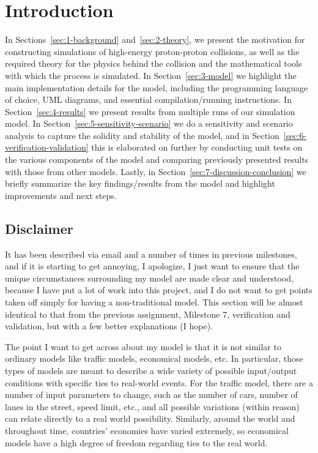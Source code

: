 

\section*{Introduction}\label{sec:0-intro}

In Sections~\ref{sec:1-background} and~\ref{sec:2-theory}, we present the motivation for constructing simulations of high-energy proton-proton collisions, as well as the required theory for the physics behind the collision and the mathematical tools with which the process is simulated. In Section~\ref{sec:3-model} we highlight the main implementation details for the model, including the programming language of choice, UML diagrams, and essential compilation/running instructions. In Section~\ref{sec:4-results} we present results from multiple runs of our simulation model. In Section~\ref{sec:5-sensitivity-scenario} we do a sensitivity and scenario analysis to capture the solidity and stability of the model, and in Section~\ref{sec:6-verification-validation} this is elaborated on further by conducting unit tests on the various components of the model and comparing previously presented results with those from other models. Lastly, in Section~\ref{sec:7-discussion-conclusion} we briefly summarize the key findings/results from the model and highlight improvements and next steps.


\subsection*{Disclaimer}\label{sec:0-disclaimer}

It has been described via email and a number of times in previous milestones, and if it is starting to get annoying, I apologize, I just want to ensure that the unique circumstances surrounding my model are made clear and understood, because I have put a lot of work into this project, and I do not want to get points taken off simply for having a non-traditional model. This section will be almost identical to that from the previous assignment, Milestone 7, verification and validation, but with a few better explanations (I hope).

The point I want to get across about my model is that it is not similar to ordinary models like traffic models, economical models, etc. In particular, those types of models are meant to describe a wide variety of possible input/output conditions with specific ties to real-world events. For the traffic model, there are a number of input parameters to change, such as the number of cars, number of lanes in the street, speed limit, etc., and all possible variations (within reason) can relate directly to a real world possibility. Similarly, around the world and throughout time, countries' economies have varied extremely, so economical models have a high degree of freedom regarding ties to the real world.

